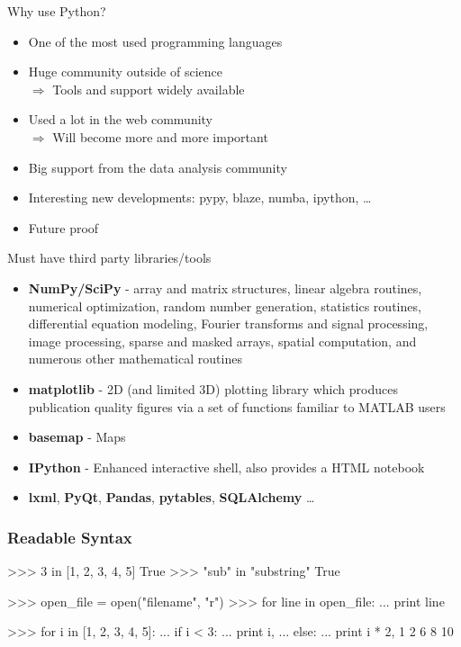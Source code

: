 \documentclass[handout]{beamer}
\begin{document}
\begin{frame}[plain]{Why use Python?}
    \begin{itemize}
        \item One of the most used programming languages
        \item Huge community outside of science \\ $\Rightarrow$ Tools and support widely available
        \item Used a lot in the web community \\ $\Rightarrow$ Will become more and more important
        \item Big support from the data analysis community
        \item Interesting new developments: pypy, blaze, numba, ipython, \dots
        \item Future proof
    \end{itemize}
\end{frame}



\begin{frame}[plain]{Must have third party libraries/tools}
    \begin{itemize}
        \item \textbf{NumPy/SciPy} - array and matrix structures, linear algebra routines, numerical optimization, random number generation, statistics routines, differential equation modeling, Fourier transforms and signal processing, image processing, sparse and masked arrays, spatial computation, and numerous other mathematical routines
        \item \textbf{matplotlib} - 2D (and limited 3D) plotting library which produces publication quality figures via a set of functions familiar to MATLAB users
        \item \textbf{basemap} - Maps
        \item \textbf{IPython} - Enhanced interactive shell, also provides a HTML notebook
        \item \textbf{lxml}, \textbf{PyQt}, \textbf{Pandas}, \textbf{pytables}, \textbf{SQLAlchemy} \dots
    \end{itemize}
\end{frame}


\begin{frame}
    \frametitle{Readable Syntax}

\begin{myColorBox}{0.8}{}
\begin{python}
>>> 3 in [1, 2, 3, 4, 5]
True
>>> "sub" in "substring"
True


>>> open_file = open("filename", "r")
>>> for line in open_file:
...     print line


>>> for i in [1, 2, 3, 4, 5]:
...   if i < 3:
...       print i,
...   else:
...       print i * 2,
1 2 6 8 10


\end{python}
\end{myColorBox}

\end{frame}
\end{document}
